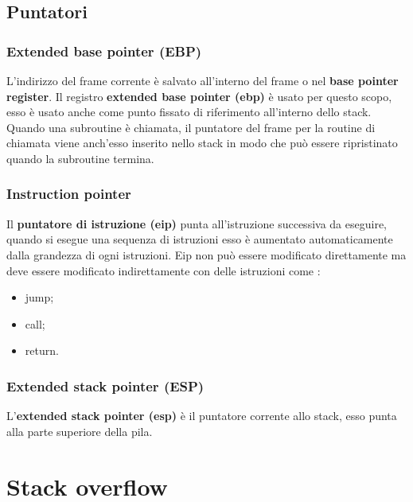 \subsection{Puntatori}
\subsubsection{Extended base pointer (EBP)}
L'indirizzo del frame corrente è salvato all'interno del frame o nel \textbf{base pointer register}. Il registro \textbf{extended base pointer (ebp) } è usato per questo scopo, esso è usato anche come punto fissato di riferimento all'interno dello stack. Quando una subroutine è chiamata, il puntatore del frame per la routine di chiamata viene anch'esso inserito nello stack in modo che può essere ripristinato quando la subroutine termina.
\subsubsection{Instruction pointer}
Il \textbf{puntatore di istruzione (eip)} punta all'istruzione successiva da eseguire, quando si esegue una sequenza di istruzioni esso è aumentato automaticamente dalla grandezza di ogni istruzioni. Eip non può essere modificato direttamente ma deve essere modificato indirettamente con delle istruzioni come :
\begin{itemize}
    \item jump;
    \item call;
    \item return.
\end{itemize}

\subsubsection{Extended stack pointer (ESP)}
L'\textbf{extended stack pointer (esp)} è il puntatore corrente allo stack, esso punta alla parte superiore della pila.



\section{Stack overflow}
